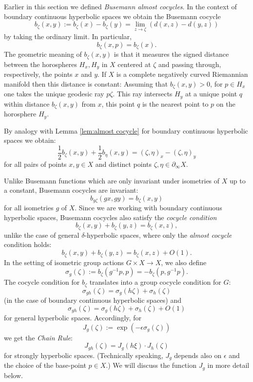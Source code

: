 \documentclass[12pt]{amsbook}%
\theoremstyle{definition}
\theoremstyle{remark}
\numberwithin{section}{chapter}
\numberwithin{subsection}{section}
\numberwithin{figure}{chapter}
\def\half{\frac{1}{2}}
\def\eps{\epsilon}
\def\geo{\partial_\infty}
\begin{document}
\medskip 
Earlier in this section we defined {\em Busemann almost cocycles}. In the context of boundary continuous hyperbolic spaces we obtain  the Busemann cocycle  
$$
b_\zeta(x,y):= b_\zeta(x)- b_\zeta(y)= \lim_{z\to \zeta} ( d(x, z)- d(y,z) )  
$$
by taking the ordinary limit. In particular,
$$
b_\zeta(x,p)= b_\zeta(x). 
$$
The geometric meaning of $b_\zeta(x,y)$ is that it measures the signed distance between the horospheres $H_x, H_y$ in $X$ centered at $\zeta$ and passing through, respectively, the points $x$ and $y$. If $X$ is a complete negatively curved Riemannian manifold then this distance is constant: Assuming that $b_\zeta(x,y)>0$, 
for $p\in H_x$ one takes the unique geodesic ray $p\zeta$. This ray intersects $H_y$ at a unique point $q$ within distance $b_\zeta(x,y)$ from $x$, this point $q$ is the nearest point to $p$ on the horosphere $H_y$. 

By analogy with Lemma \ref{lem:almost cocycle} for boundary continuous hyperbolic spaces we obtain:
\begin{equation}\label{eq:Buscocycle}
\half b_\zeta(x,y) + \half b_\eta(x,y)= (\zeta,\eta)_x- (\zeta,\eta)_y\end{equation}
for all pairs of points $x, y\in X$ and distinct points $\zeta, \eta\in \geo X$. 

\medskip 
Unlike Busemann functions which are only invariant under isometries of $X$ up to a constant, Busemann cocycles are invariant:
$$
b_{g\zeta}(gx, gy)= b_\zeta(x, y)
$$
for all isometries $g$ of $X$. Since we are working with boundary continuous hyperbolic spaces, Busemann cocycles  also satisfy the {\em cocycle condition}
$$
b_\zeta(x,y) + b_\zeta(y,z)=b_\zeta(x,z),
$$
unlike the case of general $\delta$-hyperbolic spaces, where only the {\em almost cocycle} condition holds:
$$
b_\zeta(x,y) + b_\zeta(y,z)=b_\zeta(x,z) + O(1). 
$$
In the setting of isometric group actions $G\times X\to X$, we also define
$$
\sigma_{g}(\zeta):= b_{\zeta}(g^{-1}p,p)=-b_\zeta(p, g^{-1} p).
$$
The cocycle condition for $b_\zeta$ translates into a group cocycle condition for $G$:
\begin{equation}\label{eq:cocycle}
\sigma_{gh}(\zeta)= \sigma_g(h\zeta) + \sigma_h(\zeta)
\end{equation}
(in the case of boundary continuous hyperbolic spaces) and 
$$
\sigma_{gh}(\zeta)= \sigma_g(h\zeta) + \sigma_h(\zeta) + O(1)
$$
for general hyperbolic spaces. Accordingly, for 
$$
J_g(\zeta):=\exp(-\eps\sigma_g(\zeta))$$ 
we get the {\em Chain Rule}: 
\begin{equation}\label{eq:ChainRule}
J_{gh}(\zeta)= J_g(h\xi)\cdot J_h(\zeta) 
\end{equation}
for strongly hyperbolic spaces. (Technically speaking, $J_g$ depends also on $\eps$ and the choice of the base-point $p\in X$.) 
We will discuss the function $J_g$ in more detail below. %
\end{document}
